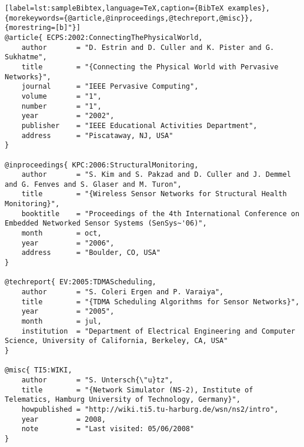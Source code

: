 \begin{lstlisting}[label=lst:sampleBibtex,language=TeX,caption={BibTeX examples},{morekeywords={@article,@inproceedings,@techreport,@misc}},{morestring=[b]"}]
@article{ ECPS:2002:ConnectingThePhysicalWorld,
	author       = "D. Estrin and D. Culler and K. Pister and G. Sukhatme",
	title        = "{Connecting the Physical World with Pervasive Networks}",
	journal      = "IEEE Pervasive Computing",
	volume       = "1",
	number       = "1",
	year         = "2002",
	publisher    = "IEEE Educational Activities Department",
	address      = "Piscataway, NJ, USA"
}

@inproceedings{ KPC:2006:StructuralMonitoring,
	author       = "S. Kim and S. Pakzad and D. Culler and J. Demmel and G. Fenves and S. Glaser and M. Turon",
	title        = "{Wireless Sensor Networks for Structural Health Monitoring}",
	booktitle    = "Proceedings of the 4th International Conference on Embedded Networked Sensor Systems (SenSys~'06)",
	month        = oct,
	year         = "2006",
	address      = "Boulder, CO, USA"
}

@techreport{ EV:2005:TDMAScheduling,
	author       = "S. Coleri Ergen and P. Varaiya",
	title        = "{TDMA Scheduling Algorithms for Sensor Networks}",
	year         = "2005",
	month        = jul,
	institution  = "Department of Electrical Engineering and Computer Science, University of California, Berkeley, CA, USA"
}

@misc{ TI5:WIKI,
	author       = "S. Untersch{\"u}tz",
	title        = "{Network Simulator (NS-2), Institute of Telematics, Hamburg University of Technology, Germany}",
	howpublished = "http://wiki.ti5.tu-harburg.de/wsn/ns2/intro",
	year         = 2008,
	note         = "Last visited: 05/06/2008"
}
\end{lstlisting}
